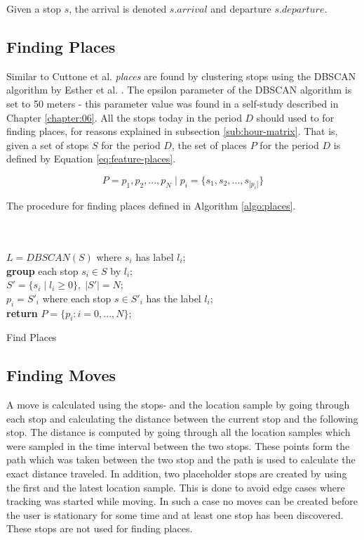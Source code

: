 Given a stop $s$, the arrival is denoted $s.arrival$ and departure $s.departure$.

\subsection{Finding Places}
Similar to Cuttone et al. \textit{places} are found by clustering stops using the DBSCAN algorithm by Esther et al. \cite{density-based-1996}. The epsilon parameter of the DBSCAN algorithm is set to 50 meters - this parameter value was found in a self-study described in Chapter \ref{chapter:06}. All the stops today in the period $D$ should used to for finding places, for reasons explained in subsection \ref{sub:hour-matrix}. That is, given a set of stops $S$ for the period $D$, the set of places $P$ for the period $D$ is defined by Equation \eqref{eq:feature-places}. 

\begin{equation}
\label{eq:feature-places}
P = {p_1, p_2, ..., p_N} \;|\; p_i = \{s_1, s_2, ..., s_{|p_i|}\}
\end{equation}

The procedure for finding places defined in Algorithm \ref{algo:places}.

\begin{algorithm}[H]
\SetAlgoLined
{}\\
\\
    $L = DBSCAN(S)$ where $s_i$ has label $l_i$;\\
    \textbf{group} each stop $s_i \in S$ by $l_i$;\\
    $S' = \{s_i \;|\; l_i \geq 0\}, \;|S'| = N$;\\
    $p_i = S'_i$ where each stop $s \in S'_i$ has the label $l_i$;\\
    \textbf{return} $P = \{p_i : i = 0, ..., N\}$;\\
 \label{algo:places}
 \caption{Find Places}
\end{algorithm}

\subsection{Finding Moves}
A move is calculated using the stops- and the location sample by going through each stop and calculating the distance between the current stop and the following stop. The distance is computed by going through all the location samples which were sampled in the time interval between the two stops. These points form the path which was taken between the two stop and the path is used to calculate the exact distance traveled. In addition, two placeholder stops are created by using the first and the latest location sample. This is done to avoid edge cases where tracking was started while moving. In such a case no moves can be created before the user is stationary for some time and at least one stop has been discovered. These stops are not used for finding places.\\

